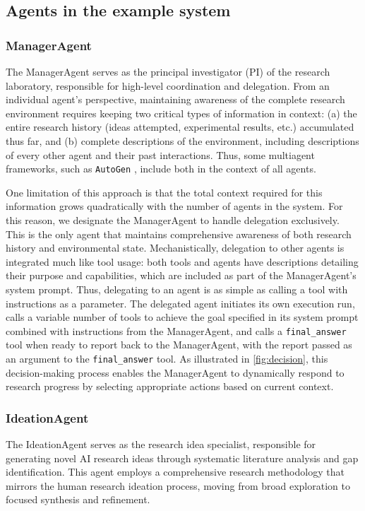 \documentclass{article}
\begin{document}
\subsection*{Agents in the example system}

\subsubsection*{ManagerAgent}
The ManagerAgent serves as the principal investigator (PI) of the research laboratory, responsible for high-level coordination and delegation. From an individual agent's perspective, maintaining awareness of the complete research environment requires keeping two critical types of information in context: (a) the entire research history (ideas attempted, experimental results, etc.) accumulated thus far, and (b) complete descriptions of the environment, including descriptions of every other agent and their past interactions. Thus, some multiagent frameworks, such as \texttt{AutoGen} \cite{wuAutoGenEnablingNextGen2023}, include both in the context of all agents.

One limitation of this approach is that the total context required for this information grows quadratically with the number of agents in the system. For this reason, we designate the ManagerAgent to handle delegation exclusively. This is the only agent that maintains comprehensive awareness of both research history and environmental state. Mechanistically, delegation to other agents is integrated much like tool usage: both tools and agents have descriptions detailing their purpose and capabilities, which are included as part of the ManagerAgent's system prompt. Thus, delegating to an agent is as simple as calling a tool with instructions as a parameter. The delegated agent initiates its own execution run, calls a variable number of tools to achieve the goal specified in its system prompt combined with instructions from the ManagerAgent, and calls a \texttt{final\_answer} tool when ready to report back to the ManagerAgent, with the report passed as an argument to the \texttt{final\_answer} tool. As illustrated in \cref{fig:decision}, this decision-making process enables the ManagerAgent to dynamically respond to research progress by selecting appropriate actions based on current context.



\subsubsection*{IdeationAgent}
The IdeationAgent serves as the research idea specialist, responsible for generating novel AI research ideas through systematic literature analysis and gap identification. This agent employs a comprehensive research methodology that mirrors the human research ideation process, moving from broad exploration to focused synthesis and refinement.
\end{document}

